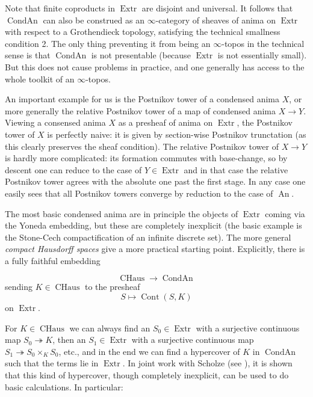 \documentclass[12pt]{article}
\theoremstyle{definition}
\newcommand{\on}{\operatorname}
\begin{document}
Note that finite coproducts in $\on{Extr}$ are disjoint and universal.  It follows that $\on{CondAn}$ can also be construed as an $\infty$-category of sheaves of anima on $\on{Extr}$ with respect to a Grothendieck topology, satisfying the technical smallness condition 2.  The only thing preventing it from being an $\infty$-topos in the technical sense is that $\on{CondAn}$ is not presentable (because $\on{Extr}$ is not essentially small).  But this does not cause problems in practice, and one generally has access to the whole toolkit of an $\infty$-topos.

An important example for us is the Postnikov tower of a condensed anima $X$, or more generally the relative Postnikov tower of a map of condensed anima $X\to Y$.  Viewing a consensed anima $X$ as a presheaf of anima on $\on{Extr}$, the Postnikov tower of $X$ is perfectly naive: it is given by section-wise Postnikov trunctation (as this clearly preserves the sheaf condition).  The relative Postnikov tower of $X\to Y$ is hardly more complicated: its formation commutes with base-change, so by descent one can reduce to the case of $Y\in \on{Extr}$ and in that case the relative Postnikov tower agrees with the absolute one past the first stage.  In any case one easily sees that all Postnikov towers converge by reduction to the case of $\on{An}$.

The most basic condensed anima are in principle the objects of $\on{Extr}$ coming via the Yoneda embedding, but these are completely inexplicit (the basic example is the Stone-Cech compactification of an infinite discrete set).  The more general \emph{compact Hausdorff spaces} give a more practical starting point.  Explicitly, there is a fully faithful embedding

$$\on{CHaus} \to \on{CondAn}$$
sending $K\in \on{CHaus}$ to the presheaf
$$S \mapsto \on{Cont}(S,K)$$
on $\on{Extr}$.

For $K\in\on{CHaus}$ we can always find an $S_0\in \on{Extr}$ with a surjective continuous map $S_0 \twoheadrightarrow K$, then an $S_1\in\on{Extr}$ with a surjective continuous map $S_1 \twoheadrightarrow S_0\times_K S_0$, etc., and in the end we can find a hypercover of $K$ in $\on{CondAn}$ such that the terms lie in $\on{Extr}$.  In joint work with Scholze (see \cite{condensed}), it is shown that this kind of hypercover, though completely inexplicit, can be used to do basic calculations.  In particular:
\end{document}
